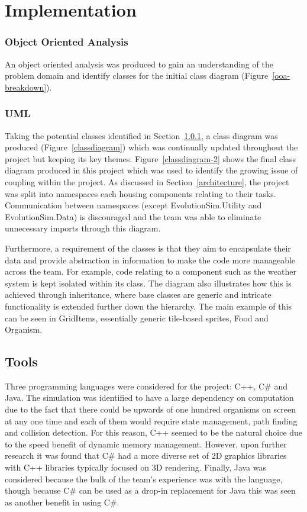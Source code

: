 \documentclass[a4paper, oneside, 11pt]{report}
\begin{document}
\chapter{Implementation} \label{implementation}

\subsection{Object Oriented Analysis}\label{ooa}
An object oriented analysis was produced to gain an understanding of the problem domain and identify classes for the initial class diagram (Figure~\ref{ooa-breakdown}).

\subsection{UML}\label{uml}
Taking the potential classes identified in Section~\ref{ooa}, a class diagram was produced (Figure~\ref{classdiagram}) which was continually updated throughout the project but keeping its key themes. Figure~\ref{classdiagram-2} shows the final class diagram produced in this project which was used to identify the growing issue of coupling within the project. As discussed in Section~\ref{architecture}, the project was split into namespaces each housing components relating to their tasks. Communication between namespaces (except EvolutionSim.Utility and EvolutionSim.Data) is discouraged and the team was able to eliminate unnecessary imports through this diagram.

Furthermore, a requirement of the classes is that they aim to encapsulate their data and provide abstraction in information to make the code more manageable across the team. For example, code relating to a component such as the weather system is kept isolated within its class. The diagram also illustrates how this is achieved through inheritance, where base classes are generic and intricate functionality is extended further down the hierarchy. The main example of this can be seen in GridItems, essentially generic tile-based sprites, Food and Organism.

\section{Tools}\label{tools}
Three programming languages were considered for the project: C++, C\# and Java. The simulation was identified to have a large dependency on computation due to the fact that there could be upwards of one hundred organisms on screen at any one time and each of them would require state management, path finding and collision detection. For this reason, C++ seemed to be the natural choice due to the speed benefit of dynamic memory management. However, upon further research it was found that C\# had a more diverse set of 2D graphics libraries with C++ libraries typically focused on 3D rendering. Finally, Java was considered because the bulk of the team's experience was with the language, though because C\# can be used as a drop-in replacement for Java this was seen as another benefit in using C\#.
\end{document}
